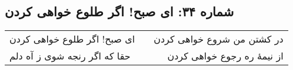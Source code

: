 \begin{center}
\section*{شماره ۳۴: ای صبح! اگر طلوع خواهی کردن}
\label{sec:034}
\begin{longtable}{l p{0.5cm} r}
ای صبح! اگر طلوع خواهی کردن
&&
در کشتن من شروع خواهی کردن
\\
حقا که اگر رنجه شوی ز آه دلم
&&
از نیمهٔ ره رجوع خواهی کردن
\\
\end{longtable}
\end{center}
